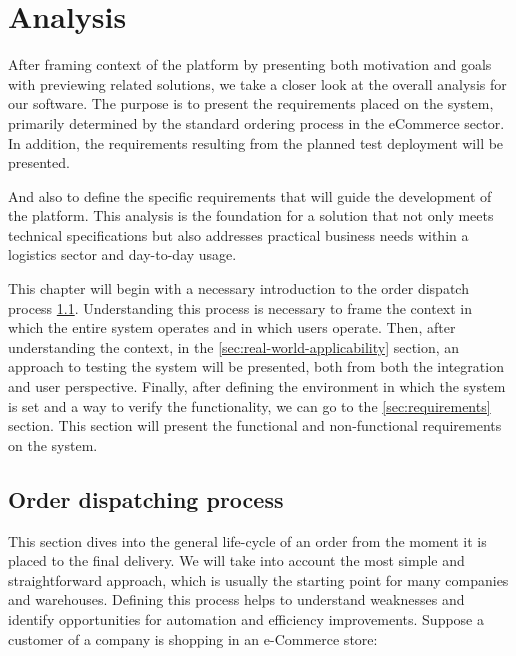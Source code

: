 \chapter{Analysis}
\label{chap:analysis}
After framing context of the platform by presenting both motivation and goals with previewing related solutions, we take a closer look at the overall analysis for our software.
The purpose is to present the requirements placed on the system, primarily determined by the standard ordering process in the eCommerce sector.
In addition, the requirements resulting from the planned test deployment will be presented.

And also to define the specific requirements that will guide the development of the platform.
This analysis is the foundation for a solution that not only meets technical specifications but also addresses practical business needs within a logistics sector and day-to-day usage.

This chapter will begin with a necessary introduction to the order dispatch process \ref{sec:order-dispatching-process}. 
Understanding this process is necessary to frame the context in which the entire system operates and in which users operate.
Then, after understanding the context, in the \ref{sec:real-world-applicability} section, an approach to testing the system will be presented, both from both the integration and user perspective.
Finally, after defining the environment in which the system is set and a way to verify the functionality, we can go to the \ref{sec:requirements} section.
This section will present the functional and non-functional requirements on the system.

% 



\section{Order dispatching process}
\label{sec:order-dispatching-process}
This section dives into the general life-cycle of an order from the moment it is placed to the final delivery.
We will take into account the most simple and straightforward approach, which is usually the starting point for many companies and warehouses.
Defining this process helps to understand weaknesses and identify opportunities for automation and efficiency improvements.
Suppose a customer of a company is shopping in an e-Commerce store:


